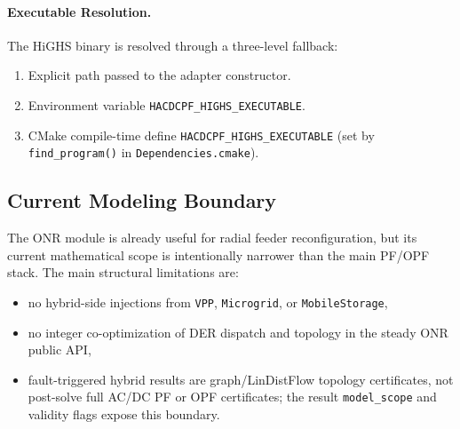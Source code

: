 \paragraph{Executable Resolution.}
The HiGHS binary is resolved through a three-level fallback:
\begin{enumerate}
  \item Explicit path passed to the adapter constructor.
  \item Environment variable \texttt{HACDCPF\_HIGHS\_EXECUTABLE}.
  \item CMake compile-time define \texttt{HACDCPF\_HIGHS\_EXECUTABLE} (set
        by \texttt{find\_program()} in \texttt{Dependencies.cmake}).
\end{enumerate}

\subsection{Current Modeling Boundary}

The ONR module is already useful for radial feeder reconfiguration, but its
current mathematical scope is intentionally narrower than the main PF/OPF stack.
The main structural limitations are:
\begin{itemize}
  \item no hybrid-side injections from \texttt{VPP}, \texttt{Microgrid}, or \texttt{MobileStorage},
  \item no integer co-optimization of DER dispatch and topology in the steady ONR public API,
  \item fault-triggered hybrid results are graph/LinDistFlow topology certificates,
        not post-solve full AC/DC PF or OPF certificates; the result
        \texttt{model\_scope} and validity flags expose this boundary.
\end{itemize}
